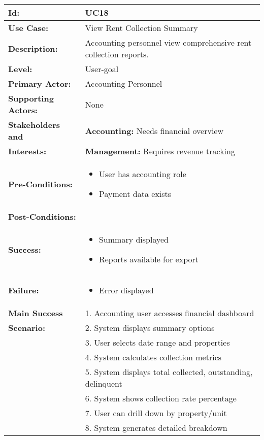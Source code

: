 \documentclass[12pt]{article}
\begin{document}
\begin{longtable}{|p{3cm}|p{11cm}|}
\hline
\textbf{Id:} & UC18 \\
\hline
\textbf{Use Case:} & View Rent Collection Summary \\
\hline
\textbf{Description:} & Accounting personnel view comprehensive rent collection reports. \\
\hline
\textbf{Level:} & User-goal \\
\hline
\textbf{Primary Actor:} & Accounting Personnel \\
\hline
\textbf{Supporting Actors:} & None \\
\hline
\textbf{Stakeholders and} & \textbf{Accounting:} Needs financial overview \\
\textbf{Interests:} & \textbf{Management:} Requires revenue tracking \\
\hline
\textbf{Pre-Conditions:} & 
\begin{itemize}
    \item User has accounting role
    \item Payment data exists
\end{itemize} \\
\hline
\textbf{Post-Conditions:} & \\
\textbf{Success:} & 
\begin{itemize}
    \item Summary displayed
    \item Reports available for export
\end{itemize} \\
\textbf{Failure:} & 
\begin{itemize}
    \item Error displayed
\end{itemize} \\
\hline
\textbf{Main Success} & 1. Accounting user accesses financial dashboard \\
\textbf{Scenario:} & 2. System displays summary options \\
& 3. User selects date range and properties \\
& 4. System calculates collection metrics \\
& 5. System displays total collected, outstanding, delinquent \\
& 6. System shows collection rate percentage \\
& 7. User can drill down by property/unit \\
& 8. System generates detailed breakdown \\

\end{longtable}
\end{document}
